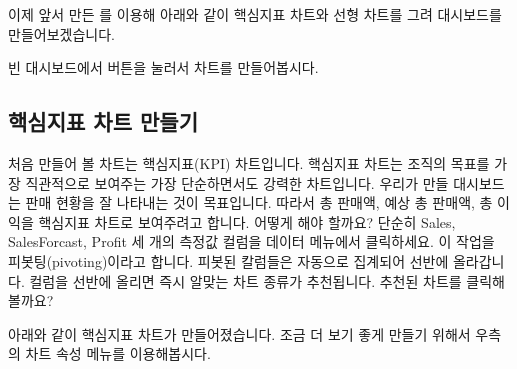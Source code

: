 \documentclass[letterpaper,10pt,english]{sphinxmanual}
\begin{document}
이제 앞서 만든 를 이용해 아래와 같이 핵심지표 차트와 선형 차트를 그려 대시보드를 만들어보겠습니다.
\begin{quote}

\begin{figure}[H]
\centering

\noindent{}
\end{figure}
\end{quote}

빈 대시보드에서  버튼을 눌러서 차트를 만들어봅시다.
\begin{quote}

\begin{figure}[H]
\centering

\noindent{}
\end{figure}
\end{quote}


\subsection{핵심지표 차트 만들기}
\label{\detokenize{discovery/part00/step3:id1}}
처음 만들어 볼 차트는 핵심지표(KPI) 차트입니다. 핵심지표 차트는 조직의 목표를 가장 직관적으로 보여주는 가장 단순하면서도 강력한 차트입니다. 우리가 만들 대시보드는 판매 현황을 잘 나타내는 것이 목표입니다. 따라서 총 판매액, 예상 총 판매액, 총 이익을 핵심지표 차트로 보여주려고 합니다. 어떻게 해야 할까요? 단순히 Sales, SalesForcast, Profit 세 개의 측정값 컬럼을 데이터 메뉴에서 클릭하세요. 이 작업을 피봇팅(pivoting)이라고 합니다. 피봇된 칼럼들은 자동으로 집계되어 선반에 올라갑니다. 컬럼을 선반에 올리면 즉시 알맞는 차트 종류가 추천됩니다. 추천된  차트를 클릭해 볼까요?
\begin{quote}

\begin{figure}[H]
\centering

\noindent{}
\end{figure}
\end{quote}

아래와 같이 핵심지표 차트가 만들어졌습니다. 조금 더 보기 좋게 만들기 위해서 우측의 차트 속성 메뉴를 이용해봅시다.
\begin{quote}

\begin{figure}[H]
\centering

\noindent{}
\end{figure}
\end{quote}
\end{document}
